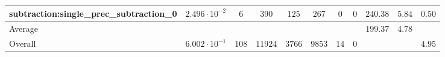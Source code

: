 \begin{tabular}{|l|c|c|c|c|c|c|c|c|c|c|}
subtraction:single\_prec\_subtraction\_0         & $ 2.496 \cdot 10^{-2} $ & $ 6      $ & $ 390   $ & $ 125  $ & $ 267   $ & $ 0  $ & $ 0 $ & $ 240.38      $ & $ 5.84    $ & $ 0.50    $ \\
\hline
Average                                          & $                     $ & $        $ & $       $ & $      $ & $       $ & $    $ & $   $ & $ 199.37      $ & $ 4.78    $ & $         $ \\
\hline
Overall                                          & $ 6.002 \cdot 10^{-1} $ & $ 108    $ & $ 11924 $ & $ 3766 $ & $ 9853  $ & $ 14 $ & $ 0 $ & $             $ & $         $ & $ 4.95    $ \\
\hline
\end{tabular}
